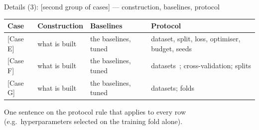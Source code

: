 \documentclass[aspectratio=43, 11pt, xcolor=dvipsnames, compress]{beamer}
\renewcommand{\cite}[2][]{\unskip}   %
\begin{document}
\begin{frame}{Details (3): [second group of cases] --- construction, baselines, protocol}
  \footnotesize
  \renewcommand{\arraystretch}{1.2}
  \begin{tabularx}{\textwidth}{@{}F Y Y Y@{}}
    \toprule
    Case & Construction & Baselines & Protocol \\
    \midrule
    {}[Case E] & what is built & the baselines, tuned~\cite{example_article} & dataset, split, loss, optimiser, budget, seeds \\
    {}[Case F] & what is built & the baselines, tuned & datasets~\cite{example_inproceedings}; cross-validation; splits \\
    {}[Case G] & what is built & the baselines, tuned~\cite{example_book} & datasets; folds \\
    \bottomrule
  \end{tabularx}
  \vskip0.2cm
  One sentence on the protocol rule that applies to every row (e.g.\ hyperparameters selected on the training fold alone).
\end{frame}

\end{document}
